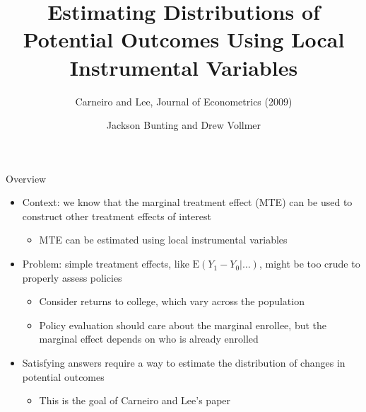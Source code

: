 \documentclass{beamer}
\newcommand{\E}{\mathrm{E}} %
\begin{document}
\title[Distributions of Potential Outcomes]{Estimating Distributions
  of Potential Outcomes Using Local Instrumental Variables}
\subtitle{Carneiro and Lee, Journal of Econometrics (2009)}
\author[]{Jackson Bunting and Drew Vollmer}
\frame{\maketitle}


\begin{frame}{Overview}

\begin{itemize}

\item Context: we know that the marginal treatment effect (MTE) can be
  used to construct other treatment effects of interest
\begin{itemize}
\item MTE can be estimated using local instrumental variables
\end{itemize}

\pause

\item Problem: simple treatment effects, like $\E(Y_1 - Y_0 | \dots)$,
  might be too crude to properly assess policies
\begin{itemize}
\item Consider returns to college, which vary across the population

\item Policy evaluation should care about the marginal enrollee, but
  the marginal effect depends on who is already enrolled
\end{itemize}

\pause

\item Satisfying answers require a way to estimate the distribution of
  changes in potential outcomes
\begin{itemize}
\item This is the goal of Carneiro and Lee's paper
\end{itemize}

\end{itemize}

\end{frame}
\end{document}
